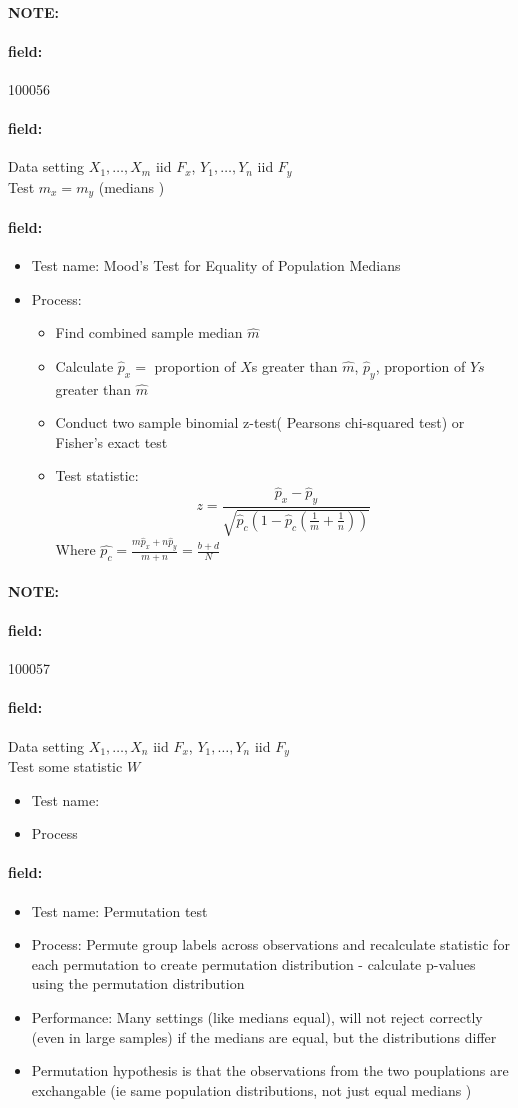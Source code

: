 \documentclass[12pt]{article}
\newenvironment{note}{\paragraph{NOTE:}}{}
\newenvironment{field}{\paragraph{field:}}{}
\begin{document}
\begin{note} \begin{field} \tiny 100056 \end{field}
 \begin{field}
  Data setting $X_1, \ldots , X_m$ iid $F_x$, $Y_1, \ldots, Y_n$ iid $F_y$\\ Test $m_x = m_y$ (medians )
 \end{field}
 \begin{field}
  \begin{itemize}
   \item Test name: Mood's Test for Equality of Population Medians
   \item Process:
         \begin{itemize}
          \item Find combined sample median $\hat{m}$
          \item Calculate $\hat{p}_x = $ proportion of $X$s greater than $\hat{m}$, $\hat{p}_y$, proportion of $Ys$ greater than $\hat{m}$
          \item Conduct two sample binomial z-test( Pearsons chi-squared test) or Fisher's exact test
          \item  Test statistic: $$ z = \frac{\hat{p}_x - \hat{p}_y}{\sqrt{\hat{p}_c(1 - \hat{p}_c(\frac{1}{m} + \frac{1}{n}))}} $$ Where $\hat{p_c} = \frac{m\hat{p}_x + n\hat{p}_y}{m+n} = \frac{b + d}{N}$
         \end{itemize}
  \end{itemize}
 \end{field}
\end{note}


\begin{note} \begin{field} \tiny 100057 \end{field}
 \begin{field}
  Data setting $X_1, \ldots , X_n$ iid $F_x$, $Y_1, \ldots, Y_n$ iid $F_y$\\ Test some statistic $W$
  \begin{itemize}
   \item Test name:
   \item Process
  \end{itemize}
 \end{field}
 \begin{field}
  \begin{itemize}
   \item Test name: Permutation test
   \item Process: Permute group labels across observations and recalculate statistic for each permutation to create permutation distribution - calculate p-values using the permutation distribution
   \item Performance: Many settings (like medians equal), will not reject correctly (even in large samples) if the medians are equal, but the distributions differ
   \item Permutation hypothesis is that the observations from the two pouplations are exchangable (ie same population distributions, not just equal medians )
  \end{itemize}
 \end{field}
\end{note}
\end{document}
